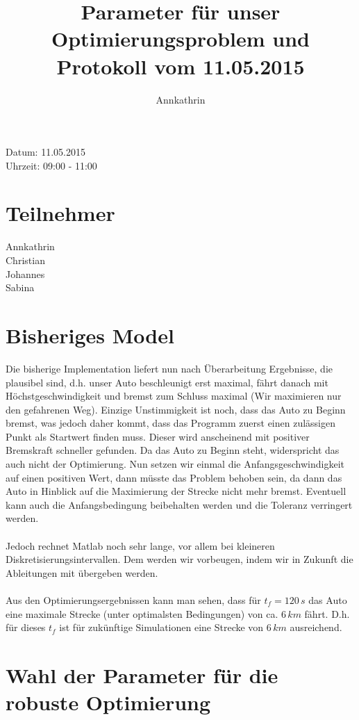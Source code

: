 \documentclass[12pt,a4paper]{article}
\theoremstyle{definition}
\theoremstyle{plain}
\begin{document}
	
\title{Parameter für unser Optimierungsproblem und Protokoll vom 11.05.2015}
\author{Annkathrin}
\maketitle

Datum: 11.05.2015\\
Uhrzeit: 09:00 - 11:00

\tableofcontents

\section{Teilnehmer}
Annkathrin\\
Christian\\
Johannes\\
Sabina

\section{Bisheriges Model}
Die bisherige Implementation liefert nun nach Überarbeitung Ergebnisse, die plausibel sind, d.h. unser Auto beschleunigt erst maximal, fährt danach mit Höchstgeschwindigkeit und bremst zum Schluss maximal (Wir maximieren nur den gefahrenen Weg). Einzige Unstimmigkeit ist noch, dass das Auto zu Beginn bremst, was jedoch daher kommt, dass das Programm zuerst einen zulässigen Punkt als Startwert finden muss. Dieser wird anscheinend mit positiver Bremskraft schneller gefunden. Da das Auto zu Beginn steht, widerspricht das auch nicht der Optimierung. Nun setzen wir einmal die Anfangsgeschwindigkeit auf einen positiven Wert, dann müsste das Problem behoben sein, da dann das Auto in Hinblick auf die Maximierung der Strecke nicht mehr bremst. Eventuell kann auch die Anfangsbedingung beibehalten werden und die Toleranz verringert werden.\\
\\
Jedoch rechnet Matlab noch sehr lange, vor allem bei kleineren Diskretisierungsintervallen. Dem werden wir vorbeugen, indem wir in Zukunft die Ableitungen mit übergeben werden.\\
\\
Aus den Optimierungsergebnissen kann man sehen, dass für $t_{f}=120\,s$ das Auto eine maximale Strecke (unter optimalsten Bedingungen) von ca. $6\,km$ fährt. D.h. für dieses $t_{f}$ ist für zukünftige Simulationen eine Strecke von $6\,km$ ausreichend. 

\section{Wahl der Parameter für die robuste Optimierung}
\end{document}
